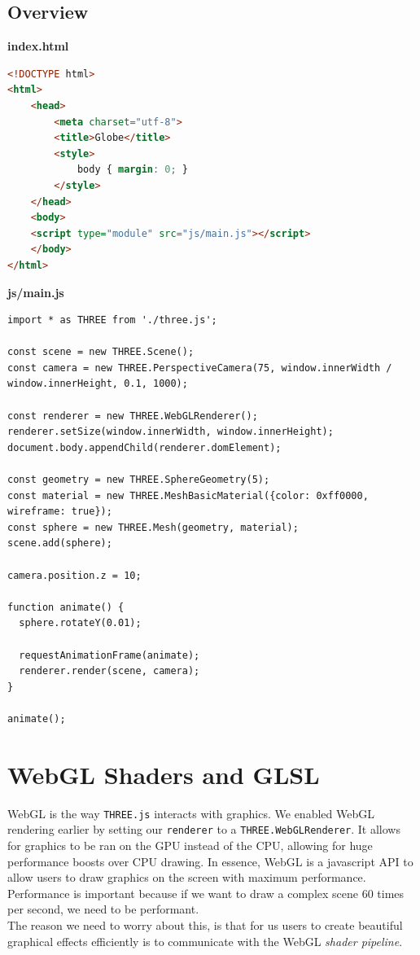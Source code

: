 \subsection{Overview}
\textbf{index.html}
\begin{lstlisting}[language=Html]
<!DOCTYPE html>
<html>
	<head>
		<meta charset="utf-8">
		<title>Globe</title>
		<style>
			body { margin: 0; }
		</style>
	</head>
	<body>
    <script type="module" src="js/main.js"></script>
	</body>
</html>
\end{lstlisting}
\newpage
\textbf{js/main.js}
\begin{lstlisting}
import * as THREE from './three.js';

const scene = new THREE.Scene();
const camera = new THREE.PerspectiveCamera(75, window.innerWidth / window.innerHeight, 0.1, 1000);

const renderer = new THREE.WebGLRenderer();
renderer.setSize(window.innerWidth, window.innerHeight);
document.body.appendChild(renderer.domElement);

const geometry = new THREE.SphereGeometry(5);
const material = new THREE.MeshBasicMaterial({color: 0xff0000, wireframe: true});
const sphere = new THREE.Mesh(geometry, material);
scene.add(sphere);

camera.position.z = 10;

function animate() {
  sphere.rotateY(0.01);

  requestAnimationFrame(animate);
  renderer.render(scene, camera);
}

animate();
\end{lstlisting}
\newpage






\section{WebGL Shaders and GLSL}
WebGL is the way \verb|THREE.js| interacts with graphics. We enabled WebGL rendering earlier by setting our \verb|renderer| to a \verb|THREE.WebGLRenderer|. It allows for graphics to be ran on the GPU instead of the CPU, allowing for huge performance boosts over CPU drawing. In essence, WebGL is a javascript API to allow users to draw graphics on the screen with maximum performance. Performance is important because if we want to draw a complex scene 60 times per second, we need to be performant. \\
The reason we need to worry about this, is that for us users to create beautiful graphical effects efficiently is to communicate with the WebGL \textit{shader pipeline}.
